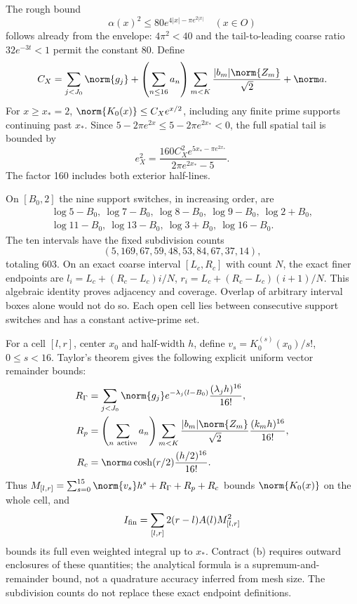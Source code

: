 \documentclass[11pt,a4paper]{article}
\numberwithin{equation}{section}
\theoremstyle{definition}\newtheorem{definition}[theorem]{Definition}
\theoremstyle{remark}\newtheorem{remark}[theorem]{Remark}
\begin{document}
The rough bound
\begin{equation}\label{c:eq:roughalpha}
 \alpha(x)^2\le80e^{4|x|-\pi e^{2|x|}}\quad(x\in O)
\end{equation}
follows already from the envelope: $4\pi^2<40$ and the tail-to-leading
coarse ratio $32e^{-3t}<1$ permit the constant 80.
Define
\[
 C_X=\sum_{j<J_0}\norm{g_j}
 +\left(\sum_{n\le16}a_n\right)
      \sum_{m<K}\frac{|b_m|\norm{Z_m}}{\sqrt2}+\norm a.
\]
For $x\ge x_*=2$, $\norm{K_0(x)}\le C_Xe^{x/2}$, including any finite
prime supports continuing past $x_*$. Since
$5-2\pi e^{2x}\le5-2\pi e^{2x_*}<0$, the full spatial tail is bounded by
\begin{equation}\label{c:eq:eX}
 e_X^2=\frac{160C_X^2e^{5x_*-\pi e^{2x_*}}}{2\pi e^{2x_*}-5}.
\end{equation}
The factor 160 includes both exterior half-lines.

On $[{B_0},2]$ the nine support switches, in increasing order, are
\[
 \begin{gathered}\log5-{B_0},\ \log7-{B_0},\ \log8-{B_0},\ \log9-{B_0},\ \log2+{B_0},\\
 \log11-{B_0},\ \log13-{B_0},\ \log3+{B_0},\ \log16-{B_0}.\end{gathered}
\]
The ten intervals have the fixed subdivision counts
\[
 (5,169,67,59,48,53,84,67,37,14),
\]
totaling 603.
On an exact coarse interval $[L_c,R_c]$ with count $N$, the exact finer
endpoints are $l_i=L_c+(R_c-L_c)i/N$, $r_i=L_c+(R_c-L_c)(i+1)/N$.
This algebraic identity proves adjacency and coverage. Overlap of
arbitrary interval boxes alone would not do so. Each open cell lies
between consecutive support switches and has a constant active-prime
set.

For a cell $[l,r]$, center $x_0$ and half-width $h$, define
$v_s=K_0^{(s)}(x_0)/s!$, $0\le s<16$. Taylor's theorem gives the
following explicit uniform vector remainder bounds:
\begin{align*}
 R_\Gamma&=\sum_{j<J_0}\norm{g_j}e^{-\lambda_j(l-{B_0})}
                   \frac{(\lambda_jh)^{16}}{16!},\\
 R_p&=\left(\sum_{n\ {\rm active}}a_n\right)
       \sum_{m<K}\frac{|b_m|\norm{Z_m}}{\sqrt2}
                   \frac{(k_mh)^{16}}{16!},\\
 R_c&=\norm a\cosh(r/2)\frac{(h/2)^{16}}{16!}.
\end{align*}
Thus $M_{[l,r]}=\sum_{s=0}^{15}\norm{v_s}h^s+R_\Gamma+R_p+R_c$
bounds $\norm{K_0(x)}$ on the whole cell, and
\begin{equation}\label{c:eq:Ifin}
 I_{\rm fin}=\sum_{[l,r]}2(r-l)A(l)M_{[l,r]}^2
\end{equation}
bounds its full even weighted integral up to $x_*$.
Contract (b) requires outward enclosures of these
quantities; the analytical formula is a supremum-and-remainder bound,
not a quadrature accuracy inferred from mesh size. The subdivision counts do not replace these exact endpoint definitions.
\end{document}
